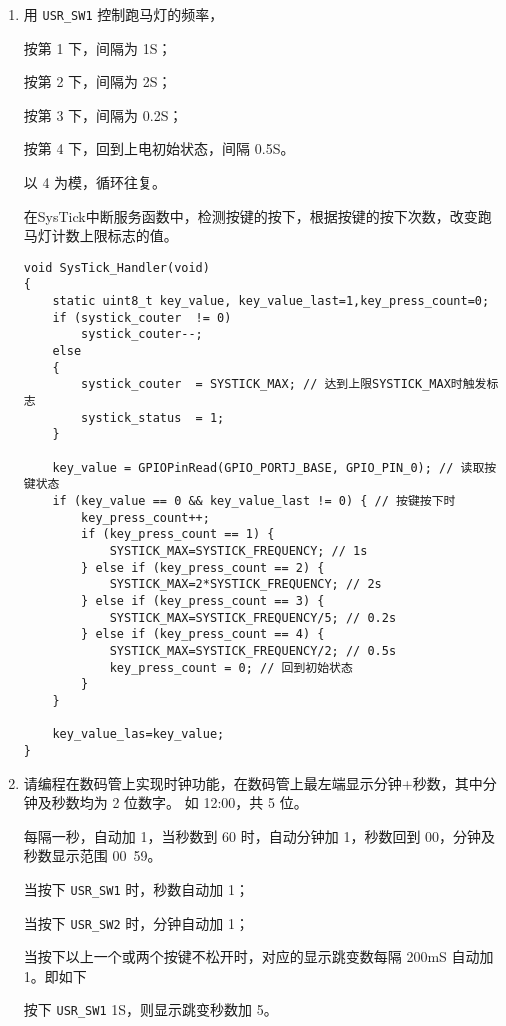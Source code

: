 \documentclass[12pt, a4paper, oneside]{ctexart}
\begin{document}
\begin{enumerate}[listparindent=2em]
        \item 用 \verb|USR_SW1| 控制跑马灯的频率，
        
        按第 1 下，间隔为 1S；
        
        按第 2 下，间隔为 2S；

        按第 3 下，间隔为 0.2S；
        
        按第 4 下，回到上电初始状态，间隔 0.5S。
        
        以 4 为模，循环往复。

        {\kaishu 在SysTick中断服务函数中，检测按键的按下，根据按键的按下次数，改变跑马灯计数上限标志的值。}

        \begin{lstlisting}
void SysTick_Handler(void)
{
    static uint8_t key_value, key_value_last=1,key_press_count=0;
    if (systick_couter	!= 0)
	    systick_couter--;
    else
    {
	    systick_couter	= SYSTICK_MAX; // 达到上限SYSTICK_MAX时触发标志
	    systick_status 	= 1;
    }

    key_value = GPIOPinRead(GPIO_PORTJ_BASE, GPIO_PIN_0); // 读取按键状态
    if (key_value == 0 && key_value_last != 0) { // 按键按下时
        key_press_count++;
        if (key_press_count == 1) {
            SYSTICK_MAX=SYSTICK_FREQUENCY; // 1s
        } else if (key_press_count == 2) {
            SYSTICK_MAX=2*SYSTICK_FREQUENCY; // 2s
        } else if (key_press_count == 3) {
            SYSTICK_MAX=SYSTICK_FREQUENCY/5; // 0.2s
        } else if (key_press_count == 4) {
            SYSTICK_MAX=SYSTICK_FREQUENCY/2; // 0.5s
            key_press_count = 0; // 回到初始状态
        }
    } 

    key_value_las=key_value;
}
        \end{lstlisting}

        \item 请编程在数码管上实现时钟功能，在数码管上最左端显示分钟+秒数，其中分钟及秒数均为 2 位数字。
        如 12:00，共 5 位。
        
        每隔一秒，自动加 1，当秒数到 60 时，自动分钟加 1，秒数回到 00，分钟及秒数显示范围 00~59。
        
        当按下 \verb|USR_SW1| 时，秒数自动加 1；
        
        当按下 \verb|USR_SW2| 时，分钟自动加 1；
        
        当按下以上一个或两个按键不松开时，对应的显示跳变数每隔 200mS 自动加 1。即如下

        按下 \verb|USR_SW1| 1S，则显示跳变秒数加 5。


\end{enumerate}
\end{document}
